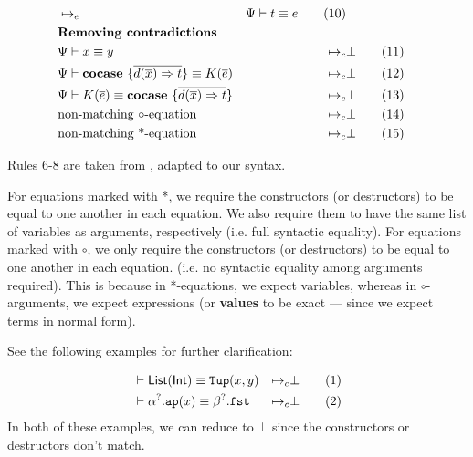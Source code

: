 \documentclass[twoside,12pt,a4paper]{article}
\begin{document}
\begin{definition}
\begin{align*}
    &\mapsto_e&\Psi\vdash t\equiv e 
    \tag{10}\\
    &\textbf{Removing contradictions}\\ 
    &\Psi \vdash x\equiv y &\mapsto_c& \bot 
    \tag{11}\\
    &\Psi \vdash \textbf{cocase}\ \{\overline{d(\overline{x})\Rightarrow t}\} \equiv K(\overline{e}) &\mapsto_c& \bot 
    \tag{12}\\
    &\Psi \vdash K(\overline{e}) \equiv \textbf{cocase}\ \{\overline{d(\overline{x})\Rightarrow t}\} &\mapsto_c& \bot
    \tag{13}\\
    &\text{non-matching $\circ$-equation}&\mapsto_c&\bot
    \tag{14}\\
    &\text{non-matching *-equation}&\mapsto_c& \bot
    \tag{15}\label{15}
    \end{align*}
\end{definition}
Rules 6-8 are taken from \cite{10.5555/2021953.2021960}, adapted to our syntax. 

For equations marked with *, we require the constructors (or destructors) to be equal to one another in each equation. 
We also require them to have the same list of variables as arguments, respectively (i.e. full syntactic equality).
For equations marked with $\circ$, we only require the constructors (or destructors) to be equal to one another in each equation. 
(i.e. no syntactic equality among arguments required).
This is because in *-equations, we expect variables, whereas in $\circ$-arguments, we expect expressions (or \textbf{values} to be exact --- since we expect terms in normal form).

See the following examples for further clarification:
\begin{example}
    \begin{align}
        &\vdash \mathsf{List(Int)}\equiv \mathtt{Tup(}x, y\mathtt{)}
        &\mapsto_c& \bot \tag{1}\\
        &\vdash \alpha^?.\texttt{ap}(x) \equiv \beta^?.\mathtt{fst}
        &\mapsto_c& \bot \tag{2}
    \end{align}
    In both of these examples, we can reduce to $\bot$ since the constructors or destructors don't match.
\end{example}
\end{document}
